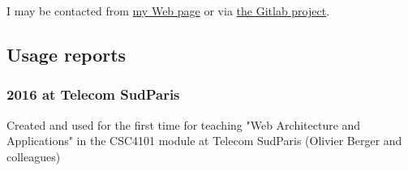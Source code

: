 \documentclass[a4paper]{article}
\begin{document}
I may be contacted from \href{http://www-public.tem-tsp.eu/~berger_o/#sec-3}{my Web page} or via \href{https://gitlab.com/olberger/org-teaching}{the Gitlab project}.

\subsection{Usage reports}
\label{sec:orgbcb0f65}

\subsubsection{2016 at Telecom SudParis}
\label{sec:org1110680}

Created and used for the first time for teaching "Web Architecture and Applications" in the CSC4101 module at Telecom SudParis (Olivier Berger and colleagues)
\end{document}
